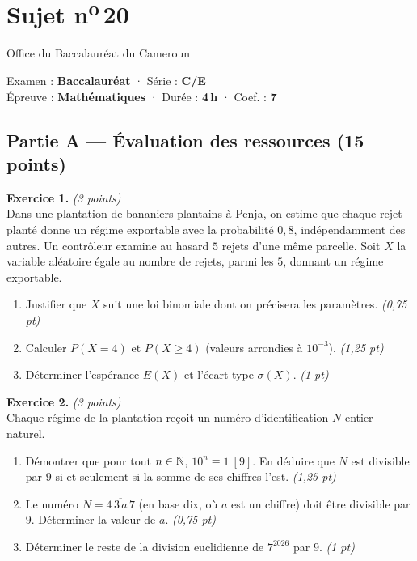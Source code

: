 \section{Sujet n\textsuperscript{o}\,20}
\noindent\begin{minipage}{0.5\linewidth}\footnotesize Office du Baccalauréat du Cameroun\end{minipage}%
\hfill\begin{minipage}{0.45\linewidth}\footnotesize\raggedleft Examen : \textbf{Baccalauréat} · Série : \textbf{C/E}\\
Épreuve : \textbf{Mathématiques} · Durée : \textbf{4\,h} · Coef. : \textbf{7}\end{minipage}
\par\smallskip{\color{onbo}\rule{\linewidth}{1pt}}

\subsection*{Partie A — Évaluation des ressources \hfill (15 points)}

\noindent\textbf{Exercice 1.} \hfill\textit{(3 points)}\\
Dans une plantation de bananiers-plantains à Penja, on estime que chaque rejet planté
donne un régime exportable avec la probabilité $0{,}8$, indépendamment des autres. Un
contrôleur examine au hasard $5$ rejets d'une même parcelle. Soit $X$ la variable
aléatoire égale au nombre de rejets, parmi les $5$, donnant un régime exportable.
\begin{enumerate}[label=\arabic*)]
\item Justifier que $X$ suit une loi binomiale dont on précisera les paramètres. \hfill\textit{(0,75 pt)}
\item Calculer $P(X=4)$ et $P(X\ge 4)$ (valeurs arrondies à $10^{-3}$). \hfill\textit{(1,25 pt)}
\item Déterminer l'espérance $E(X)$ et l'écart-type $\sigma(X)$. \hfill\textit{(1 pt)}
\end{enumerate}

\smallskip
\noindent\textbf{Exercice 2.} \hfill\textit{(3 points)}\\
Chaque régime de la plantation reçoit un numéro d'identification $N$ entier naturel.
\begin{enumerate}[label=\arabic*)]
\item Démontrer que pour tout $n\in\mathbb{N}$, $10^{n}\equiv 1\ [9]$. En déduire que $N$ est
divisible par $9$ si et seulement si la somme de ses chiffres l'est. \hfill\textit{(1,25 pt)}
\item Le numéro $N=\overline{4\,3\,a\,7}$ (en base dix, où $a$ est un chiffre) doit être
divisible par $9$. Déterminer la valeur de $a$. \hfill\textit{(0,75 pt)}
\item Déterminer le reste de la division euclidienne de $7^{2026}$ par $9$. \hfill\textit{(1 pt)}
\end{enumerate}

